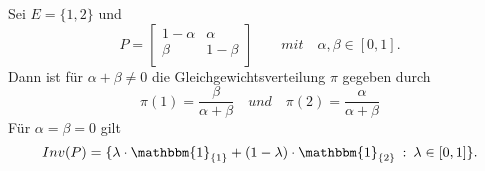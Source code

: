 Sei $E = \lbrace 1,2 \rbrace$ und 
\begin{equation*}
P=
\begin{bmatrix}
 1- \alpha & \alpha \\
 \beta & 1-\beta \\
\end{bmatrix}
\qquad mit \quad \alpha , \beta \in [0,1].
\end{equation*}
Dann ist für $\alpha + \beta \neq 0$ die Gleichgewichtsverteilung $\pi$ gegeben durch
\begin{equation*}
\pi(1) = \dfrac{\beta}{\alpha + \beta } \quad und \quad \pi(2) = \dfrac{\alpha}{\alpha + \beta }
\end{equation*}
Für $\alpha = \beta = 0$ gilt
\begin{equation*}
Inv(P) = \lbrace \lambda \cdot \mathbbm{1}_{\lbrace 1 \rbrace} + (1-\lambda) \cdot \mathbbm{1}_{\lbrace 2 \rbrace} \: : \: \lambda \in [0,1] \rbrace.
\end{equation*}